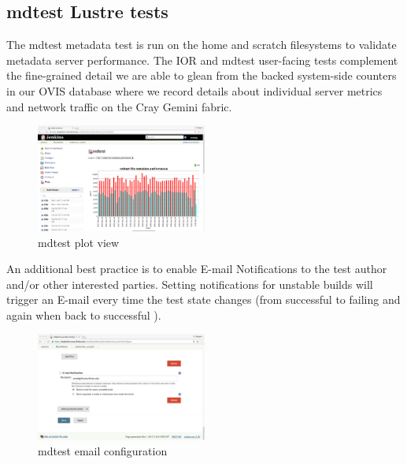 \documentclass[10pt, conference, compsocconf]{IEEEtran}
\begin{document}
\subsection{mdtest Lustre tests}
The mdtest metadata test is run on the home and scratch filesystems to validate metadata server performance.  The IOR and mdtest user-facing tests complement the fine-grained detail we are able to glean from the backed system-side counters in our OVIS database where we record details about individual server metrics and network traffic on the Cray Gemini fabric.  
\begin{figure}[H]
\centering
\includegraphics[width=0.5\textwidth]{mdtest-plot}
\caption{ mdtest plot view }
\label{fig:mdtest-plot}
\end{figure}

An additional best practice is to enable E-mail Notifications to the test author and/or other interested parties.  Setting notifications for unstable builds will trigger an E-mail every time the test state changes (from successful to failing and again when back to successful ).
\begin{figure}[H]
\centering
\includegraphics[width=0.5\textwidth]{mdtest-config-email}
\caption{ mdtest email configuration }
\label{fig:mdtest-config-email}
\end{figure}
\end{document}
